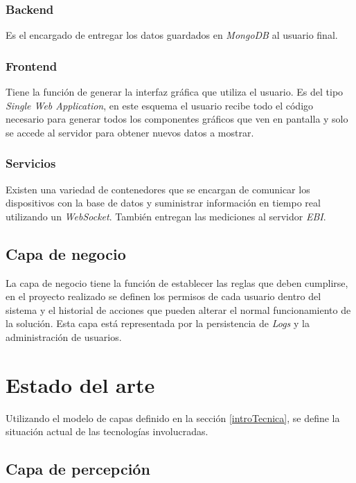 		\subsubsection{Backend}
		
			Es el encargado de entregar los datos guardados en \emph{MongoDB} al usuario final.
		
		\subsubsection{Frontend}
		
			Tiene la función de generar la interfaz gráfica que utiliza el usuario. Es del tipo \emph{Single Web Application}, en este esquema el usuario recibe todo el código necesario para generar todos los componentes gráficos que ven en pantalla y solo se accede al servidor para obtener nuevos datos a mostrar.
		
		\subsubsection{Servicios}
		
			Existen una variedad de contenedores que se encargan de comunicar los dispositivos con la base de datos y suministrar información en tiempo real utilizando un \emph{WebSocket}. También entregan las mediciones al servidor \emph{EBI}.
	
	\subsection{Capa de negocio}
	\label{capaNegocio}
	
		La capa de negocio tiene la función de establecer las reglas que deben cumplirse, en el proyecto realizado se definen los permisos de cada usuario dentro del sistema y el historial de acciones que pueden alterar el normal funcionamiento de la solución. Esta capa está representada por la persistencia de \emph{Logs} y la administración de usuarios.

\section{Estado del arte}
\label{estadoArte}

	Utilizando el modelo de capas definido en la sección \ref{introTecnica}, se define la situación actual de las tecnologías involucradas.
	
	\subsection{Capa de percepción}
	\label{artPercepcion}
	
